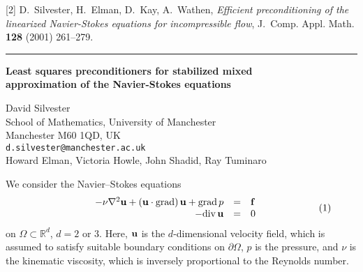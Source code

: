 \documentclass[twosided]{report}
\begin{document}
[2] D.~Silvester, H.~Elman, D.~Kay, A.~Wathen,
{\em Efficient preconditioning of the linearized
Navier-Stokes equations for incompressible flow},
J.~Comp. Appl. Math. {\bf 128} (2001) 261--279.


	\begin{center} \rule{6in}{1pt} \end{center}

\begin{center}
{\large			%
{\bf Least squares preconditioners for stabilized mixed \\
	approximation of the Navier-Stokes equations}}

	David Silvester \\
	School of Mathematics, University of Manchester \\
	Manchester M60 1QD, UK \\
	{\tt d.silvester@manchester.ac.uk} \\
	Howard Elman, Victoria Howle, John Shadid, Ray Tuminaro
\end{center}
We consider the Navier--Stokes equations
$$
\qquad
\qquad
\qquad
\begin{array}{rcl} -\nu \nabla^2 {\bf u} + ({\bf
u} \cdot {\rm grad})\, {\bf u} + {\rm grad}\, p &= &{\bf f}
\\ -{\rm div}\, {\bf u} &= &0 \end{array}
\qquad
\qquad
\qquad
(1)
$$
on
$\Omega \subset \mathbb{R}^d$, $d=2$ or $3$.
Here, ${\bf u}$
is the $d$-dimensional velocity field, which is assumed to
satisfy suitable boundary conditions on $\partial \Omega$,
$p$ is the pressure, and $\nu$ is the kinematic viscosity,
which is inversely proportional to the Reynolds number.
\end{document}
